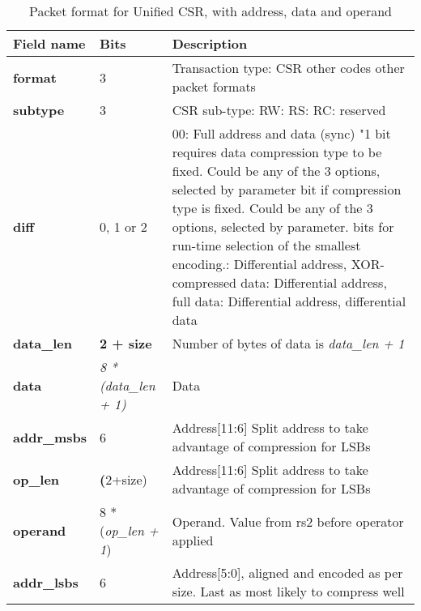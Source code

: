 \begin{table}[htp]
  \centering
  \caption{Packet format for Unified CSR, with address, data and operand}
  \label{tab:te_datadx0y9}
  \begin{tabulary}{\textwidth}{|l|p{40mm}|p{90mm}|}
    \hline
    {\bf Field name} & {\bf Bits} & {\bf Description} \\
    \hline
    \textbf{format} & 	3	& Transaction type: CSR\newline
		other codes other packet formats\\
    \hline
    \textbf{subtype} & 	3	& CSR sub-type: RW: RS: RC: reserved\\	
    \hline
    \textbf{diff} & 0, 1 or 2 & 00: Full address and data (sync)	"1 bit requires data compression type to be fixed.  Could be any of the 3 options, selected by parameter bit if compression type is fixed. Could be any of the 3 options, selected by parameter. bits for run-time selection of the smallest encoding.:  Differential address, XOR-compressed data: Differential address, full data: Differential address, differential data\\
    \hline
    \textbf{data\_len}	& \textbf{2 + size} & Number of bytes of data is \textit {data\_len + 1}\\
    \hline
    \textbf{data} & \textit {8 * (data\_len + 1)} & Data\\
    \hline
    \textbf{addr\_msbs} & 6  &	Address[11:6]	Split address to take advantage of compression for LSBs\\
    \hline
    \textbf{op\_len} & \textbf(2+size)  & Address[11:6]	Split address to take advantage of compression for LSBs\\    
    \hline
    \textbf{operand}	& 8 * (\textit{op\_len + 1}) & Operand.  Value from rs2 before operator applied\\
    \hline
    \textbf{addr\_lsbs} &  6 & Address[5:0], aligned and encoded as per size. Last as most likely to compress well \\
    \hline
  \end{tabulary}
\end{table}

